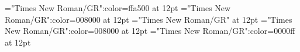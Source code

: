 \documentclass[a4paper]{article}
\begin{document}
\pagestyle{plain}
\sloppy
\setlength{\parfillskip}{0pt plus 1fil}
\font\xitemen="Times New Roman/GR":color=ffa500 at 12pt
\font\xitemenxitem="Times New Roman/GR":color=008000 at 12pt
\font\main="Times New Roman/GR" at 12pt
\font\xitemenmain="Times New Roman/GR":color=008000 at 12pt
\font\xitemmain="Times New Roman/GR":color=0000ff at 12pt

\mbox{} 
\newpage 
\newpage 
\setcounter{page}{1} 
\pagestyle{fancy} 








\end{document}
